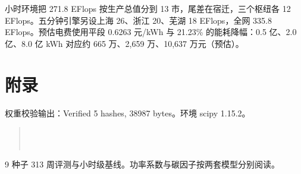 小时环境把 271.8 EFlops 按生产总值分到 13 市，尾差在宿迁，三个枢纽各 12 EFlops。五分钟引擎另设上海 26、浙江 20、芜湖 18 EFlops，全网 335.8 EFlops。预估电费使用平段 0.6263 元/kWh 与 21.23\% 的能耗降幅：0.5 亿、2.0 亿、8.0 亿 kWh 对应约 665 万、2{,}659 万、10{,}637 万元（预估）。

\section{附录}
权重校验输出：Verified 5 hashes, 38987 bytes。环境 scipy 1.15.2。

\begin{quote}\small
{}\\
\\
\end{quote}

\begin{thebibliography}{9}
 种子 313 周评测与小时级基线。功率系数与碳因子按两套模型分别阅读。
\end{thebibliography}

